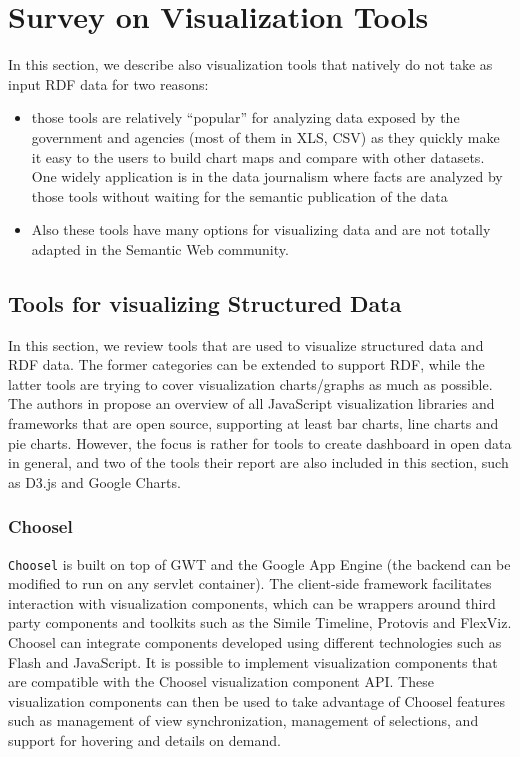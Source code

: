 
\section{Survey on Visualization Tools }
\label{sec:visu-soa}

In this section, we describe also visualization tools that natively do not take as input RDF data for two reasons:
\begin{itemize}
\item those tools are relatively ``popular'' for analyzing data exposed by the government and agencies  (most of them in XLS, CSV) as they quickly make it easy to the users  to build chart  maps and compare with other datasets. One widely application is in the data journalism  where facts are analyzed by those tools without waiting for the semantic publication of the data
\item Also these tools have many options for visualizing data and are not totally adapted in the Semantic Web community.

\end{itemize}


\subsection{Tools for visualizing Structured Data}
\label{sec:strucdataviz}

In this section, we review tools that are used to visualize structured data and RDF data. The former categories can be extended to support RDF, while the latter tools are trying to cover visualization charts/graphs as much as possible. The authors in \cite{odm14} propose an overview of all JavaScript visualization libraries and frameworks that are open source, supporting at least bar charts, line charts and pie charts. However, the focus is rather for tools to create dashboard in open data in general, and two of the tools their report are also included in this section, such as D3.js and Google Charts.

\subsubsection{Choosel}
\label{sec:choosel}

\texttt{Choosel} \cite{lars2010} is built on top of GWT  and the Google App Engine  (the backend can be modified to run on any servlet container). The client-side framework facilitates interaction with visualization components, which can be wrappers around third party components and toolkits such as the Simile Timeline, Protovis and FlexViz. Choosel can integrate components developed using different technologies such as Flash and JavaScript. It is possible to implement visualization components that are compatible with the Choosel visualization component API. These visualization components can then be used to take advantage of Choosel features such as management of view synchronization, management of selections, and support for hovering and details on demand.

